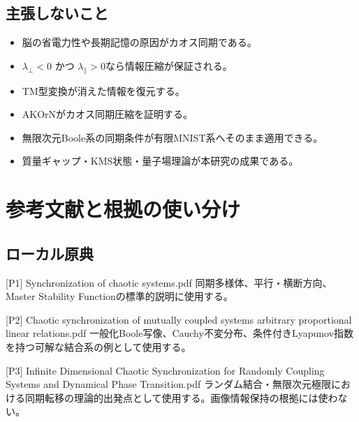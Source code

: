 \documentclass[11pt,a4paper]{ltjsarticle}
\begin{document}
\subsection*{\textcolor{researchblue}{主張しないこと}}

\begin{itemize}

\item 脳の省電力性や長期記憶の原因がカオス同期である。

\item \(\lambda_{\perp}<0\) かつ \(\lambda_{\parallel}>0\)なら情報圧縮が保証される。

\item TM型変換が消えた情報を復元する。

\item AKOrNがカオス同期圧縮を証明する。

\item 無限次元Boole系の同期条件が有限MNIST系へそのまま適用できる。

\item 質量ギャップ・KMS状態・量子場理論が本研究の成果である。

\end{itemize}

\goodbreak

\section*{\textcolor{researchink}{参考文献と根拠の使い分け}}


\subsection*{\textcolor{researchblue}{ローカル原典}}

[P1] \textcolor{researchblue}{Synchronization of chaotic systems.pdf} 同期多様体、平行・横断方向、Master Stability Functionの標準的説明に使用する。\par

[P2] \textcolor{researchblue}{Chaotic synchronization of mutually coupled systems arbitrary proportional linear relations.pdf} 一般化Boole写像、Cauchy不変分布、条件付きLyapunov指数を持つ可解な結合系の例として使用する。\par

[P3] \textcolor{researchblue}{Infinite Dimensional Chaotic Synchronization for Randomly Coupling Systems and Dynamical Phase Transition.pdf} ランダム結合・無限次元極限における同期転移の理論的出発点として使用する。画像情報保持の根拠には使わない。\par
\end{document}
